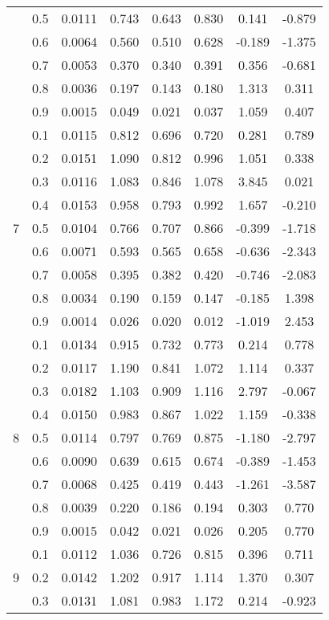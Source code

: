 \documentclass[11pt,a4paper]{report}
\begin{document}
\begin{longtable}{ | c | c || c | c | c | c | c | c | }
 & 0.5 & 0.0111 & 0.743 & 0.643 & 0.830 & 0.141 & -0.879 \\
 & 0.6 & 0.0064 & 0.560 & 0.510 & 0.628 & -0.189 & -1.375 \\
 & 0.7 & 0.0053 & 0.370 & 0.340 & 0.391 & 0.356 & -0.681 \\
 & 0.8 & 0.0036 & 0.197 & 0.143 & 0.180 & 1.313 & 0.311 \\
 & 0.9 & 0.0015 & 0.049 & 0.021 & 0.037 & 1.059 & 0.407 \\
 \hline
\multirow{9}{*}{7} & 0.1 & 0.0115 & 0.812 & 0.696 & 0.720 & 0.281 & 0.789 \\
 & 0.2 & 0.0151 & 1.090 & 0.812 & 0.996 & 1.051 & 0.338 \\
 & 0.3 & 0.0116 & 1.083 & 0.846 & 1.078 & 3.845 & 0.021 \\
 & 0.4 & 0.0153 & 0.958 & 0.793 & 0.992 & 1.657 & -0.210 \\
 & 0.5 & 0.0104 & 0.766 & 0.707 & 0.866 & -0.399 & -1.718 \\
 & 0.6 & 0.0071 & 0.593 & 0.565 & 0.658 & -0.636 & -2.343 \\
 & 0.7 & 0.0058 & 0.395 & 0.382 & 0.420 & -0.746 & -2.083 \\
 & 0.8 & 0.0034 & 0.190 & 0.159 & 0.147 & -0.185 & 1.398 \\
 & 0.9 & 0.0014 & 0.026 & 0.020 & 0.012 & -1.019 & 2.453 \\
 \hline
\multirow{9}{*}{8} & 0.1 & 0.0134 & 0.915 & 0.732 & 0.773 & 0.214 & 0.778 \\
 & 0.2 & 0.0117 & 1.190 & 0.841 & 1.072 & 1.114 & 0.337 \\
 & 0.3 & 0.0182 & 1.103 & 0.909 & 1.116 & 2.797 & -0.067 \\
 & 0.4 & 0.0150 & 0.983 & 0.867 & 1.022 & 1.159 & -0.338 \\
 & 0.5 & 0.0114 & 0.797 & 0.769 & 0.875 & -1.180 & -2.797 \\
 & 0.6 & 0.0090 & 0.639 & 0.615 & 0.674 & -0.389 & -1.453 \\
 & 0.7 & 0.0068 & 0.425 & 0.419 & 0.443 & -1.261 & -3.587 \\
 & 0.8 & 0.0039 & 0.220 & 0.186 & 0.194 & 0.303 & 0.770 \\
 & 0.9 & 0.0015 & 0.042 & 0.021 & 0.026 & 0.205 & 0.770 \\
 \hline
\multirow{9}{*}{9} & 0.1 & 0.0112 & 1.036 & 0.726 & 0.815 & 0.396 & 0.711 \\
 & 0.2 & 0.0142 & 1.202 & 0.917 & 1.114 & 1.370 & 0.307 \\
 & 0.3 & 0.0131 & 1.081 & 0.983 & 1.172 & 0.214 & -0.923 \\

\end{longtable}
\end{document}
